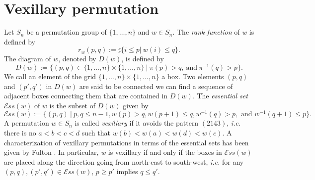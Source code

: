 \documentclass[12pt, reqno,sumlimits]{amsart}
\newtheorem{prop}[thm]{Proposition}
\theoremstyle{definition}
\numberwithin{equation}{section}
\newcommand{\Ess}{{\mathcal{E}ss}}
\begin{document}
\section{Vexillary permutation}\label{SecVex}
Let $S_n$ be a permutation group of $\{1,\dots,n\}$ and $w \in S_n$.  The \emph{rank function} of $w$ is defined by
\[
r_w(p,q) := \sharp\{ i\leq p  |\ w(i) \leq q\}.
\]
The diagram of $w$, denoted by $D(w)$, is defined by
\[
D(w):=\{(p,q)\in \{1,\dots,n\}\times \{1,\dots,n\} \ |\ \pi(p) >q, \ \mbox{and} \ \pi^{-1}(q)>p\}.
\]
We call an element of the grid $\{1,\dots, n\} \times \{1,\dots,n\}$ a box. Two elements $(p,q)$ and $(p',q')$ in $D(w)$ are said to be connected 
we can find a sequence of adjacent boxes connecting them that are contained in $D(w)$. The \emph{essential set} $\Ess(w)$ of $w$ is the subset of $D(w)$ given by
\[
\Ess(w):=\{(p,q) \ |\ p,q\leq n-1, w(p)>q, w(p+1)\leq q, w^{-1}(q)>p, \mbox{ and } w^{-1}(q+1)\leq p\}.
\]
A permutation $w \in S_n$ is called \emph{vexillary} if it avoids the pattern $(2143)$, \textit{i.e.} there is no $a<b<c<d$ such that $w(b)<w(a)<w(d)<w(c)$. A characterization of vexillary permutations in terms of the essential sets has been given by Fulton \cite[Proposition 9.6]{FlagsFulton}. In particular, $w$ is vexillary if and only if the boxes in $\Ess(w)$ are placed along the direction going from north-east to south-west, {\it i.e.} for any $(p,q), (p',q') \in \Ess(w)$, $p\geq p'$ implies $q\leq q'$.
\end{document}
